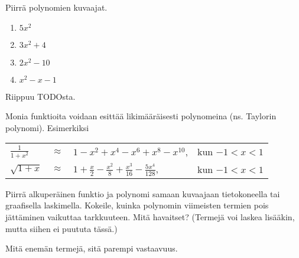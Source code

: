 \begin{tehtava}
    Piirrä polynomien kuvaajat.
    \begin{enumerate}
        \item $5x^2$
        \item $3x^2+4$
        \item $2x^2-10$
        \item $x^2-x-1$
    \end{enumerate}
    \begin{vastaus}
        Riippuu TODOsta.
    \end{vastaus}
\end{tehtava}

\begin{tehtava}
	Monia funktioita voidaan esittää likimääräisesti polynomeina (ns. Taylorin polynomi). Esimerkiksi

	\begin{tabular}{lcll}
	$\frac{1}{1+x^2}$ &$\approx$ & $1-x^2+x^4-x^6+x^8-x^{10}$, & kun $-1<x<1$ \\
	$\sqrt{1+x}$ & $\approx $ & $ 1+\frac{x}{2}
	-\frac{x^2}{8}+\frac{x^3}{16}-\frac{5x^4}{128}$, & kun $-1<x<1$
	\end{tabular}

	Piirrä alkuperäinen funktio ja polynomi samaan kuvaajaan tietokoneella tai graafisella laskimella. Kokeile, kuinka polynomin viimeisten termien pois jättäminen vaikuttaa tarkkuuteen. Mitä havaitset? (Termejä voi laskea lisääkin, mutta siihen ei puututa tässä.)

	\begin{vastaus}
		Mitä enemän termejä, sitä parempi vastaavuus.
	\end{vastaus}
\end{tehtava}